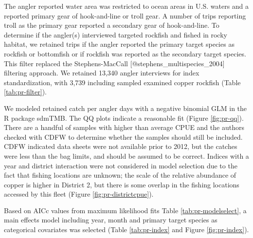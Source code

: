 \documentclass[
  letterpaper,
]{article}
\begin{document}
The angler reported water area was restricted to ocean areas in U.S. waters
and a reported primary gear
of hook-and-line or troll gear. A number of trips reporting troll as the primary gear reported
a secondary gear of hook-and-line. To determine if the angler(s) interviewed targeted rockfish and
fished in rocky habitat, we retained trips if the angler reported the primary target species
as rockfish or bottomfish or if rockfish was reported as the secondary target species. This filter
replaced the Stephens-MacCall {[}@stephens\_multispecies\_2004{]} filtering approach. We retained 13,340 angler
interviews for index standardization, with 3,739 including sampled examined copper rockfish (Table \ref{tab:pr-filter}).

We modeled retained catch per angler days with a negative binomial GLM in the R package sdmTMB.
The QQ plots indicate a reasonable fit (Figure \ref{fig:pr-qq}). There are a handful of samples
with higher than average CPUE and the authors checked with CDFW to determine whether the samples should still be included.
CDFW indicated data sheets were not available prior to 2012, but the catches were less than
the bag limits, and should be assumed to be correct. Indices with a year and district interaction were not
considered in model selection due to the fact that fishing locations are unknown; the scale of the relative
abundance of copper is higher in District 2, but there is some overlap in the fishing locations accessed
by this fleet (Figure \ref{fig:pr-districtcpue}).

Based on AICc values from maximum likelihood fits Table \ref{tab:pr-modelselect},
a main effects model including year, month and primary target species as categorical covariates
was selected (Table \ref{tab:pr-index} and Figure \ref{fig:pr-index}).

\newpage

\begingroup\fontsize{10}{12}\selectfont
\begingroup\fontsize{10}{12}\selectfont
\end{document}
